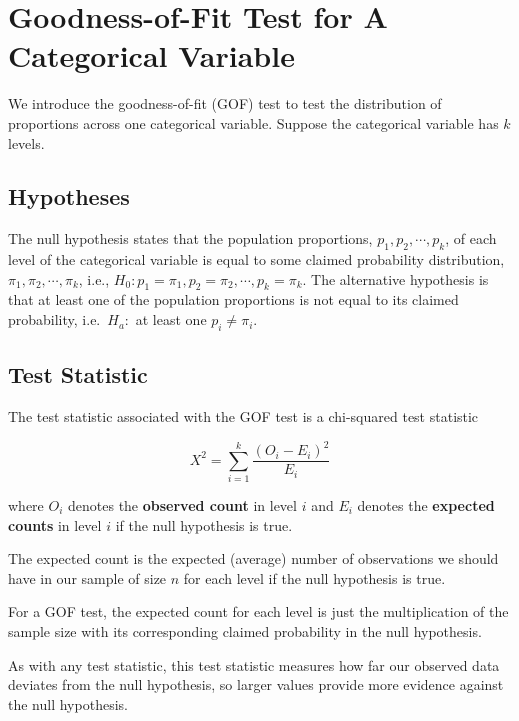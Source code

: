 \documentclass[
]{book}
\theoremstyle{definition}
\theoremstyle{definition}
\theoremstyle{definition}
\theoremstyle{definition}
\theoremstyle{remark}
\begin{document}
\hypertarget{goodness-of-fit-test-for-a-categorical-variable}{%
\section{Goodness-of-Fit Test for A Categorical Variable}\label{goodness-of-fit-test-for-a-categorical-variable}}

We introduce the goodness-of-fit (GOF) test to test the distribution of proportions across one categorical variable. Suppose the categorical variable has \(k\) levels.

\hypertarget{hypotheses-1}{%
\subsection{Hypotheses}\label{hypotheses-1}}

The null hypothesis states that the population proportions, \(p_1, p_2, \cdots, p_k\), of each level of the categorical variable is equal to some claimed probability distribution, \(\pi_1, \pi_2, \cdots, \pi_k\), i.e., \(H_0: p_1 = \pi_1, p_2 = \pi_2, \cdots, p_k = \pi_k\). The alternative hypothesis is that at least one of the population proportions is not equal to its claimed probability, i.e.~\(H_a:\) at least one \(p_i \neq \pi_i\).

\hypertarget{test-statistic-3}{%
\subsection{Test Statistic}\label{test-statistic-3}}

The test statistic associated with the GOF test is a chi-squared test statistic

\begin{equation} 
X^2 = \sum_{i=1}^k \frac{(O_i - E_i)^2}{E_i}
\label{eq:18-GOFts}
\end{equation}

where \(O_i\) denotes the \textbf{observed count} in level \(i\) and \(E_i\) denotes the \textbf{expected counts} in level \(i\) if the null hypothesis is true.

The expected count is the expected (average) number of observations we should have in our sample of size \(n\) for each level if the null hypothesis is true.

For a GOF test, the expected count for each level is just the multiplication of the sample size with its corresponding claimed probability in the null hypothesis.

As with any test statistic, this test statistic measures how far our observed data deviates from the null hypothesis, so larger values provide more evidence against the null hypothesis.
\end{document}
